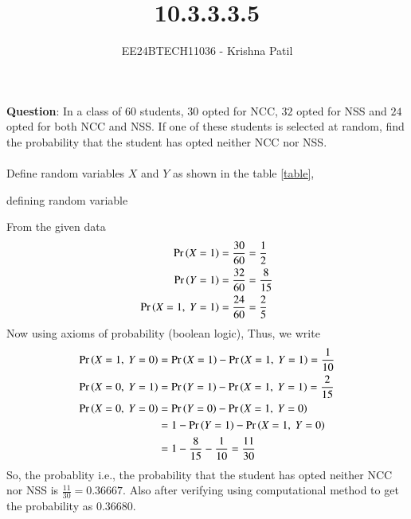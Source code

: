 \documentclass[journal]{IEEEtran}
\begin{document}

\vspace{3cm}

\title{10.3.3.3.5}
\author{EE24BTECH11036 - Krishna Patil}
{\let\newpage\relax\maketitle}

\renewcommand{\thefigure}{\theenumi}
\renewcommand{\thetable}{\theenumi}
\setlength{\intextsep}{10pt} %


\textbf{Question}: In a class of $60$ students, $30$ opted for NCC, $32$ opted for NSS and $24$ opted for both NCC and NSS. If one of these students is selected at random, find the probability that the student has opted neither NCC nor NSS. \\ \\
\solution
Define random variables $X$ and $Y$ as shown in the table \ref{table}, \\
\begin{table}[h!]    
  \centering
  
  \caption{defining random variable}
  \label{table}
\end{table}
\newline From the given data
    \begin{align}
        \Pr\left(X=1\right) &= \frac{30}{60} = \frac{1}{2} \\
        \Pr\left(Y=1\right) &= \frac{32}{60} = \frac{8}{15} \\
        \Pr\left(X=1,\ Y=1\right) &= \frac{24}{60} = \frac{2}{5}    
    \end{align}
Now using axioms of probability (boolean logic),
Thus, we write
    \begin{align}
	    \Pr\left(X=1,\ Y=0\right) &= \Pr\left(X=1\right) - \Pr\left(X=1,\ Y=1\right) = \frac{1}{10} \\
	    \Pr\left(X=0,\ Y=1\right) &= \Pr\left(Y=1\right) - \Pr\left(X=1,\ Y=1\right) = \frac{2}{15} \\
            \Pr\left(X=0,\ Y=0\right) &= \Pr\left(Y=0\right) - \Pr\left(X=1,\ Y=0\right) \\
			   &= 1 - \Pr\left(Y=1\right) - \Pr\left(X=1,\ Y=0\right) \\
        		   &= 1 - \frac{8}{15} - \frac{1}{10} = \frac{11}{30}
    \end{align}
\newline So, the probablity  i.e., the probability that the student has opted neither NCC nor NSS is $\frac{11}{30} = 0.36667$.
Also after verifying using computational method to get the probability as 0.36680.
\end{document}
